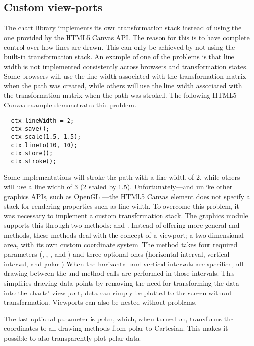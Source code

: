 \subsection{Custom view-ports}
The chart library implements its own transformation stack instead of using the one provided by the HTML5 Canvas API. The reason for this is to have complete control over how lines are drawn. This can only be achieved by not using the built-in transformation stack. An example of one of the problems is that line width is not implemented consistently across browsers and transformation states. Some browsers will use the line width associated with the transformation matrix when the path was created, while others will use the line width associated with the transformation matrix when the path was stroked. The following HTML5 Canvas example demonstrates this problem.
\begin{verbatim}
  ctx.lineWidth = 2;
  ctx.save();
  ctx.scale(1.5, 1.5);
  ctx.lineTo(10, 10);
  ctx.store();
  ctx.stroke();
\end{verbatim}
Some implementations will stroke the path with a line width of 2, while others will use a line width of 3 (2 scaled by 1.5). Unfortunately---and unlike other graphics APIs, such as OpenGL \cite{shreiner05}---the HTML5 Canvas element does not specify a stack for rendering properties such as line width. To overcome this problem, it was necessary to implement a custom transformation stack. The graphics module supports this through two methods:  and . Instead of offering more general  and  methods, these methods deal with the concept of a viewport; a two dimensional area, with its own custom coordinate system. The  method takes four required parameters (, , , and ) and three optional ones (horizontal interval, vertical interval, and polar.) When the horizontal and vertical intervals are specified, all drawing between the  and  method calls are performed in those intervals. This simplifies drawing data points by removing the need for transforming the data into the charts' view port; data can simply be plotted to the screen without transformation. Viewports can also be nested without problems.

The last optional parameter is polar, which, when turned on, transforms the coordinates to all drawing methods from polar to Cartesian. This makes it possible to also transparently plot polar data.

